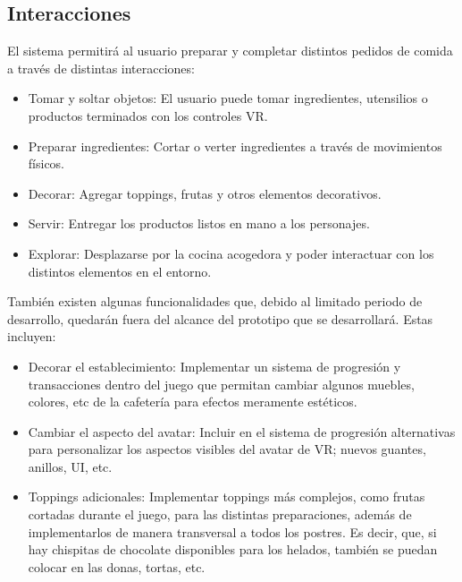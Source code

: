 \documentclass[conference]{IEEEtran}
\begin{document}
\subsection*{Interacciones}
El sistema permitirá al usuario preparar y completar distintos pedidos de comida a través de distintas interacciones:

\begin{itemize}
    \item Tomar y soltar objetos: El usuario puede tomar ingredientes, utensilios o productos terminados con los controles VR. \medskip

    \item Preparar ingredientes: Cortar o verter ingredientes a través de movimientos físicos. \medskip

    \item Decorar: Agregar toppings, frutas y otros elementos decorativos. \medskip

    \item Servir: Entregar los productos listos en mano a los personajes. \medskip

    \item Explorar: Desplazarse por la cocina acogedora y poder interactuar con los distintos elementos en el entorno. \medskip
\end{itemize}

También existen algunas funcionalidades que, debido al limitado periodo de desarrollo, quedarán fuera del alcance del prototipo que se desarrollará. Estas incluyen: 

\begin{itemize}
    \item Decorar el establecimiento: Implementar un sistema de progresión y transacciones dentro del juego que permitan cambiar algunos muebles, colores, etc de la cafetería para efectos meramente estéticos. \medskip

    \item Cambiar el aspecto del avatar: Incluir en el sistema de progresión alternativas para personalizar los aspectos visibles del avatar de VR; nuevos guantes, anillos, UI, etc. \medskip

    \item Toppings adicionales: Implementar toppings más complejos, como frutas cortadas durante el juego, para las distintas preparaciones, además de implementarlos de manera transversal a todos los postres. Es decir, que, si hay chispitas de chocolate disponibles para los helados, también se puedan colocar en las donas, tortas, etc. \medskip
\end{itemize}
\end{document}
